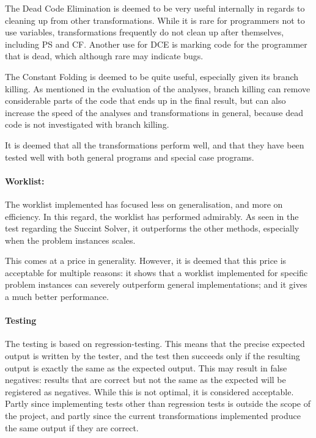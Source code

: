 The Dead Code Elimination is deemed to be very useful internally in regards
to cleaning up from other transformations. While it is rare for programmers
not to use variables, transformations frequently do not clean up after themselves,
including PS and CF. Another use for DCE is marking code for the programmer
that is dead, which although rare may indicate bugs.

The Constant Folding is deemed to be quite useful, especially given its
branch killing. As mentioned in the evaluation of the analyses,
branch killing can remove considerable parts of the code that ends up
in the final result, but can also increase the speed of the analyses and
transformations in general, because dead code is not investigated with
branch killing.

It is deemed that all the transformations perform well, and that they
have been tested well with both general programs and special case programs.

\paragraph{Worklist:}
The worklist implemented has focused less on generalisation, and more
on efficiency. In this regard, the worklist has performed admirably.
As seen in the test regarding the Succint Solver, it outperforms
the other methods, especially when the problem instances scales.

This comes at a price in generality. However, it is deemed that
this price is acceptable for multiple reasons: it shows that a worklist
implemented for specific problem instances can severely outperform
general implementations; and it gives a much better performance.

\paragraph{Testing}

The testing is based on regression-testing. This means that the precise expected
output is written by the tester, and the test then succeeds only if the resulting
output is exactly the same as the expected output. This may result in false negatives:
results that are correct but not the same as the expected will be registered as negatives.
While this is not optimal, it is considered acceptable. Partly since implementing tests other
than regression tests is outside the scope of the project, and partly since the current
transformations implemented produce the same output if they are correct.


